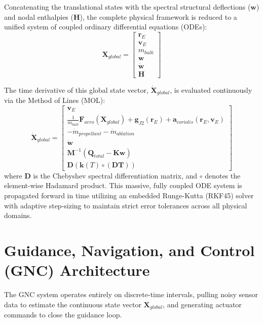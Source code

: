 \documentclass[11pt,a4paper]{article}
\theoremstyle{definition}
\numberwithin{equation}{section}
\begin{document}
Concatenating the translational states with the spectral structural deflections ($\mathbf{w}$) and nodal enthalpies ($\mathbf{H}$), the complete physical framework is reduced to a unified system of coupled ordinary differential equations (ODEs):
\begin{equation}
\mathbf{X}_{global} = \begin{bmatrix} \mathbf{r}_E \\ \mathbf{v}_E \\ m_{bulk} \\ \mathbf{w} \\ \mathbf{\dot{w}} \\ \mathbf{H} \end{bmatrix}
\end{equation}

The time derivative of this global state vector, $\mathbf{\dot{X}}_{global}$, is evaluated continuously via the Method of Lines (MOL):
\begin{equation}
\mathbf{\dot{X}}_{global} = \begin{bmatrix} 
    \mathbf{v}_E \\ 
    \frac{1}{m_{bulk}}\mathbf{F}_{aero}(\mathbf{X}_{global}) + \mathbf{g}_{J2}(\mathbf{r}_E) + \mathbf{a}_{coriolis}(\mathbf{r}_E, \mathbf{v}_E) \\ 
    -\dot{m}_{propellant} - \dot{m}_{ablation} \\
    \mathbf{\dot{w}} \\ 
    \mathbf{M}^{-1}(\mathbf{Q}_{total} - \mathbf{K}\mathbf{w}) \\ 
    \mathbf{D} \left( \mathbf{k}(T) \circ (\mathbf{D}\mathbf{T}) \right) 
\end{bmatrix}
\end{equation}
where $\mathbf{D}$ is the Chebyshev spectral differentiation matrix, and $\circ$ denotes the element-wise Hadamard product. This massive, fully coupled ODE system is propagated forward in time utilizing an embedded Runge-Kutta (RKF45) solver with adaptive step-sizing to maintain strict error tolerances across all physical domains.

\section{Guidance, Navigation, and Control (GNC) Architecture}
\label{sec:gnc}

The GNC system operates entirely on discrete-time intervals, pulling noisy sensor data to estimate the continuous state vector $\mathbf{X}_{global}$, and generating actuator commands to close the guidance loop.
\end{document}

